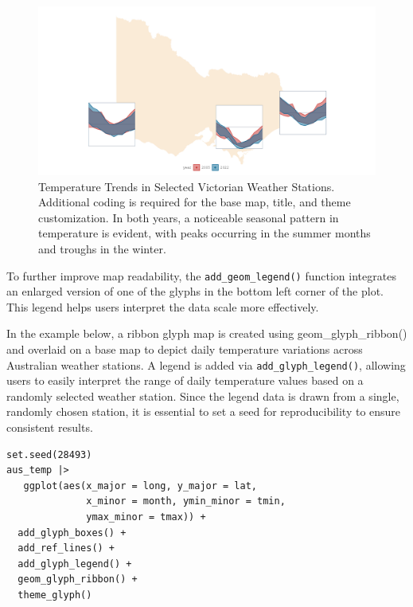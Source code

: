 \begin{figure}

{\centering \includegraphics[width=1\linewidth]{figures/hist_temp} 

}

\caption{Temperature Trends in Selected Victorian Weather Stations. Additional coding is required for the base map, title, and theme customization. In both years, a noticeable seasonal pattern in temperature is evident, with peaks occurring in the summer months and troughs in the winter.}\label{fig:unnamed-chunk-13}
\end{figure}

To further improve map readability, the \texttt{add\_geom\_legend()} function integrates an enlarged version of one of the glyphs in the bottom left corner of the plot. This legend helps users interpret the data scale more effectively.

In the example below, a ribbon glyph map is created using geom\_glyph\_ribbon() and overlaid on a base map to depict daily temperature variations across Australian weather stations. A legend is added via \texttt{add\_glyph\_legend()}, allowing users to easily interpret the range of daily temperature values based on a randomly selected weather station. Since the legend data is drawn from a single, randomly chosen station, it is essential to set a seed for reproducibility to ensure consistent results.

\begin{verbatim}
set.seed(28493)
aus_temp |>
   ggplot(aes(x_major = long, y_major = lat,
              x_minor = month, ymin_minor = tmin,
              ymax_minor = tmax)) +
  add_glyph_boxes() +
  add_ref_lines() +
  add_glyph_legend() +
  geom_glyph_ribbon() +
  theme_glyph() 
\end{verbatim}

